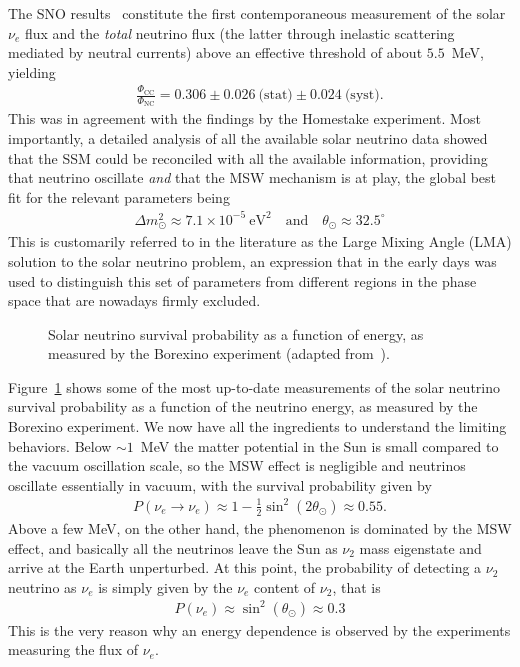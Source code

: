 The SNO results~\cite{2004PhRvL..92r1301A} constitute the first contemporaneous
measurement of the solar $\nu_e$ flux and the \emph{total} neutrino flux (the
latter through inelastic scattering mediated by neutral currents) above an
effective threshold of about $5.5$~MeV, yielding
\begin{align*}
  \frac{\Phi_\text{CC}}{\Phi_\text{NC}} =
  0.306 \pm 0.026~\text{(stat)} \pm 0.024~\text{(syst)}.
\end{align*}
This was in agreement with the findings by the Homestake experiment. Most importantly,
a detailed analysis of all the available solar neutrino data showed that the SSM
could be reconciled with all the available information, providing that neutrino
oscillate \emph{and} that the MSW mechanism is at play, the global best fit for the
relevant parameters being
\begin{align*}
  \Delta m^2_\odot \approx 7.1 \times 10^{-5}~\text{eV}^2
  \quad\text{and}\quad
  \theta_\odot \approx 32.5^\circ
\end{align*}
This is customarily referred to in the literature as the Large Mixing Angle (LMA)
solution to the solar neutrino problem, an expression that in the early days was
used to distinguish this set of parameters from different regions in the phase space
that are nowadays firmly excluded.

\begin{figure}[!htbp]
  
  \caption{Solar neutrino survival probability as a function of energy,
    as measured by the Borexino experiment (adapted from~\cite{2018Natur.562..505B}).}
  \label{fig:solar_nu_survival}
\end{figure}

Figure~\ref{fig:solar_nu_survival} shows some of the most up-to-date measurements
of the solar neutrino survival probability as a function of the neutrino
energy, as measured by the Borexino experiment. We now have all the ingredients
to understand the limiting behaviors. Below $\sim 1$~MeV the matter potential
in the Sun is small compared to the vacuum oscillation scale, so the MSW effect
is negligible and neutrinos oscillate essentially in vacuum, with the survival
probability given by
\begin{align*}
  P(\nu_e \rightarrow \nu_e) \approx 1 - \frac{1}{2}\sin^2(2\theta_\odot) \approx 0.55.
\end{align*}
Above a few MeV, on the other hand, the phenomenon is dominated by the MSW effect,
and basically all the neutrinos leave the Sun as $\nu_2$ mass eigenstate and
arrive at the Earth unperturbed. At this point, the probability of detecting
a $\nu_2$ neutrino as $\nu_e$ is simply given by the $\nu_e$ content of $\nu_2$,
that is
\begin{align*}
  P(\nu_e) \approx \sin^2(\theta_\odot) \approx 0.3
\end{align*}
This is the very reason why an energy dependence is observed by the experiments
measuring the flux of $\nu_e$.


